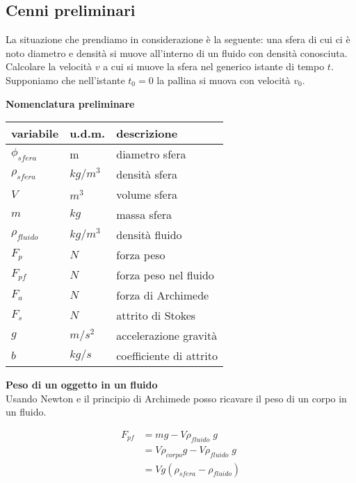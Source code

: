 \subsection{Cenni preliminari}
La situazione che prendiamo in considerazione è la seguente: una sfera di cui ci è noto diametro e densità si muove all'interno di un fluido con densità conosciuta. Calcolare la velocità \(v\) a cui si muove la sfera nel generico istante di tempo \(t\). Supponiamo che nell'istante \(t_0 = 0\) la pallina si muova con velocità \(v_0\).
\hfill 

\begin{flushleft}
\textbf{Nomenclatura preliminare}
\end{flushleft}
\begin{center}
\begin{tabular}{ | m{5em} | m{1.4cm}| m{10em} | } 
\hline
variabile &  u.d.m. & descrizione \\ 
\hline
\hline
\(\phi_{sfera}\) & m & diametro sfera \\ 
\hline
\(\rho_{sfera}\) & \(kg/m^3\) & densità sfera \\ 
\hline
\(V\) & \(m^3\) & volume sfera \\ 
\hline
\(m\) & \(kg\) & massa sfera \\ 
\hline
\(\rho_{fluido}\) & \(kg/m^3\) & densità fluido \\ 
\hline
\(F_p\) & \(N\) & forza peso \\ 
\hline
\(F_{pf}\) & \(N\) & forza peso nel fluido \\ 
\hline
\(F_a\) & \(N\) & forza di Archimede \\ 
\hline
\(F_s\) & \(N\) & attrito di Stokes \\ 
\hline
\(g\) & \(m/s^2\) & accelerazione gravità \\ 
\hline
\(b\) & \(kg/s\) & coefficiente di attrito \\ 
\hline
\end{tabular}
\end{center}

\begin{flushleft}
\textbf{Peso di un oggetto in un fluido}\\
Usando Newton e il principio di Archimede posso ricavare il peso di un corpo in un fluido.
\end{flushleft}
\begin{equation}\label{eq4}
    \begin{split}
    F_{pf} &= mg - V\rho_{fluido}\;g\\
        &= V\rho_{corpo}g - V\rho_{fluido}\;g\\
        &=Vg(\rho_{sfera} - \rho_{fluido})
    \end{split}
\end{equation}

